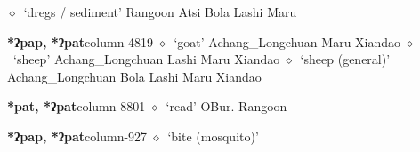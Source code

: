          $\diamond$~`dregs / sediment'
         Rangoon 
\hspace{1ex}
         Atsi 
\hspace{1ex}
         Bola 
\hspace{1ex}
         Lashi 
\hspace{1ex}
         Maru 
  \item {\footnotesize \textbf{*ʔpap, *ʔpat}}{\tiny column-4819}
         $\diamond$~`goat'
         Achang\_Longchuan 
\hspace{1ex}
         Maru 
\hspace{1ex}
         Xiandao 
\hspace{1ex}
         $\diamond$~`sheep'
         Achang\_Longchuan 
\hspace{1ex}
         Lashi 
\hspace{1ex}
         Maru 
\hspace{1ex}
         Xiandao 
\hspace{1ex}
         $\diamond$~`sheep (general)'
         Achang\_Longchuan 
\hspace{1ex}
         Bola 
\hspace{1ex}
         Lashi 
\hspace{1ex}
         Maru 
\hspace{1ex}
         Xiandao 
  \item {\footnotesize \textbf{*pat, *ʔpat}}{\tiny column-8801}
         $\diamond$~`read'
         OBur. 
\hspace{1ex}
         Rangoon 
  \item {\footnotesize \textbf{*ʔpap, *ʔpat}}{\tiny column-927}
         $\diamond$~`bite (mosquito)'
